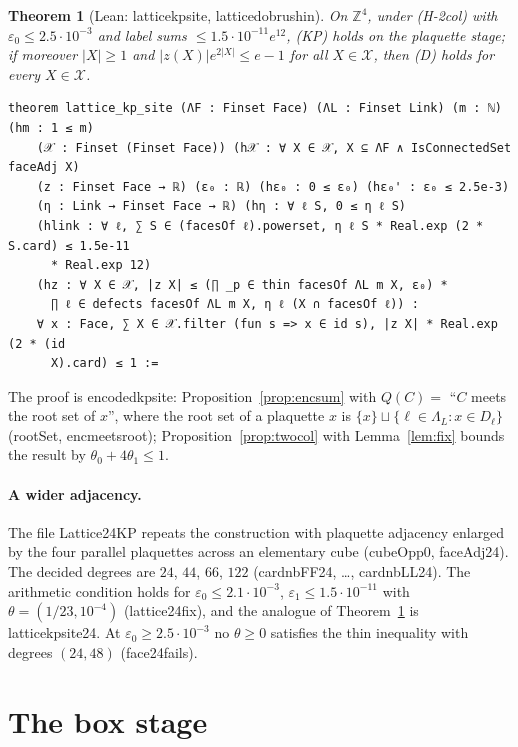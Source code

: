 \documentclass[11pt,a4paper]{article}
\newtheorem{theorem}{Theorem}[section]
\theoremstyle{definition}
\theoremstyle{remark}
\DeclareRobustCommand{\lean}[1]{{\ttfamily\renewcommand{\_}{\textunderscore\allowbreak}#1}}
\newenvironment{leanquote}{\par\smallskip\footnotesize}{\par\smallskip}
\newcommand{\Z}{\mathbb{Z}}
\begin{document}
\begin{theorem}[Lean: \lean{lattice\_kp\_site}, \lean{lattice\_dobrushin}]\label{thm:face}
On $\Z^4$, under (H-2col) with $\varepsilon_0\le2.5\cdot10^{-3}$ and label sums $\le1.5\cdot10^{-11}e^{12}$, (KP) holds on the plaquette stage; if moreover $|X|\ge1$ and $|z(X)|e^{2|X|}\le e-1$ for all $X\in\mathcal X$, then (D) holds for every $X\in\mathcal X$.
\end{theorem}
\begin{leanquote}
\begin{verbatim}
theorem lattice_kp_site (ΛF : Finset Face) (ΛL : Finset Link) (m : ℕ) (hm : 1 ≤ m)
    (𝒳 : Finset (Finset Face)) (h𝒳 : ∀ X ∈ 𝒳, X ⊆ ΛF ∧ IsConnectedSet faceAdj X)
    (z : Finset Face → ℝ) (ε₀ : ℝ) (hε₀ : 0 ≤ ε₀) (hε₀' : ε₀ ≤ 2.5e-3)
    (η : Link → Finset Face → ℝ) (hη : ∀ ℓ S, 0 ≤ η ℓ S)
    (hlink : ∀ ℓ, ∑ S ∈ (facesOf ℓ).powerset, η ℓ S * Real.exp (2 * S.card) ≤ 1.5e-11
      * Real.exp 12)
    (hz : ∀ X ∈ 𝒳, |z X| ≤ (∏ _p ∈ thin facesOf ΛL m X, ε₀) *
      ∏ ℓ ∈ defects facesOf ΛL m X, η ℓ (X ∩ facesOf ℓ)) :
    ∀ x : Face, ∑ X ∈ 𝒳.filter (fun s => x ∈ id s), |z X| * Real.exp (2 * (id
      X).card) ≤ 1 :=
\end{verbatim}
\end{leanquote}
The proof is \lean{encoded\_kp\_site}: Proposition~\ref{prop:encsum} with $Q(C)=$ ``$C$ meets the root set of $x$'', where the root set of a plaquette $x$ is $\{x\}\sqcup\{\ell\in\Lambda_L:x\in D_\ell\}$ (\lean{rootSet}, \lean{enc\_meets\_root}); Proposition~\ref{prop:twocol} with Lemma~\ref{lem:fix} bounds the result by $\theta_0+4\theta_1\le1$.

\paragraph{A wider adjacency.} The file \lean{Lattice24KP} repeats the construction with plaquette adjacency enlarged by the four parallel plaquettes across an elementary cube (\lean{cubeOpp0}, \lean{faceAdj24}). The decided degrees are $24$, $44$, $66$, $122$ (\lean{card\_nbFF24\_0}, \dots, \lean{card\_nbLL24\_0}). The arithmetic condition holds for $\varepsilon_0\le2.1\cdot10^{-3}$, $\varepsilon_1\le1.5\cdot10^{-11}$ with $\theta=(1/23,10^{-4})$ (\lean{lattice24\_fix}), and the analogue of Theorem~\ref{thm:face} is \lean{lattice\_kp\_site24}. At $\varepsilon_0\ge2.5\cdot10^{-3}$ no $\theta\ge0$ satisfies the thin inequality with degrees $(24,48)$ (\lean{face24\_fails}).

\section{The box stage}\label{sec:box}
\end{document}
